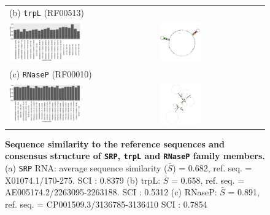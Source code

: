 \documentclass[ twoside,openright,titlepage,numbers=noenddot,headinclude,%
                footinclude=false, cleardoublepage=empty,abstractoff, %
                BCOR=5mm,paper=a4,fontsize=11pt,%
                ngerman,american,%
                ]{scrreprt}
\begin{document}
\begin{figure}
\begin{tabular}{l|l}
\hline
(b) \texttt{trpL} (RF00513) 
\\ 
\includegraphics[width=0.5\textwidth]{./pictures/sequenceSimilarity/trpL.pdf} &
\includegraphics[width=0.4\textwidth]{./pictures/consensusStructure/TRP.pdf} \\
\hline
(c) \texttt{RNaseP} (RF00010)
\\
 \includegraphics[width=0.5\textwidth]{./pictures/sequenceSimilarity/RNaseP.pdf} &
 \includegraphics[width=0.4\textwidth]{./pictures/consensusStructure/RNaseP.pdf}\\
\end{tabular}
\caption{{\bf Sequence similarity  to the reference sequences and consensus structure of \texttt{SRP}, \texttt{trpL} and \texttt{RNaseP} family members.} 
  (a) \texttt{SRP} RNA: average sequence similarity ($\bar{S}$) = 0.682, ref. seq. = X01074.1/170-275. 
  			   SCI : 0.8379													 
  (b) trpL:  $\bar{S}$ = 0.658, ref. seq. = AE005174.2/2263095-2263188. 
			 SCI : 0.5312	 					 						   
  (c) RNaseP: $\bar{S}$ = 0.891, ref. seq. = CP001509.3/3136785-3136410
			  SCI : 	0.7854	 				}
\label{fig:sequence_similarity}
\end{figure}
      
\end{document}
